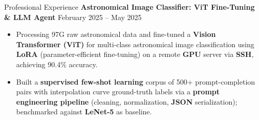 \begin{rSection}{Professional Experience}
\textbf{Astronomical Image Classifier: ViT Fine-Tuning \& LLM Agent} \hfill February 2025 -- May 2025
\begin{itemize}
\vspace{-5pt}
    \item Processing 97G raw astronomical data and fine-tuned a \textbf{Vision Transformer (ViT)} for multi-class astronomical image classification using \textbf{LoRA} (parameter-efficient fine-tuning) on a remote \textbf{GPU} server via \textbf{SSH}, achieving 90.4\% accuracy.
    \item Built a \textbf{supervised few-shot learning} corpus of 500+ prompt-completion pairs with interpolation curve ground-truth labels via a \textbf{prompt engineering pipeline} (cleaning, normalization, \textbf{JSON} serialization); benchmarked against \textbf{LeNet-5}  as baseline.
\end{itemize}

\end{rSection}
